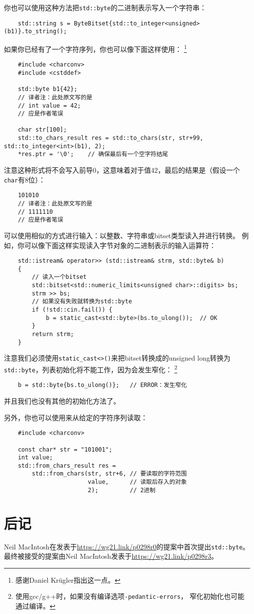 你也可以使用这种方法把\texttt{std::byte}的二进制表示写入一个字符串：
\begin{lstlisting}
    std::string s = ByteBitset{std::to_integer<unsigned>(b1)}.to_string();
\end{lstlisting}
如果你已经有了一个字符序列，你也可以像下面这样使用：
\footnote{感谢Daniel Krügler指出这一点。}
\begin{lstlisting}
    #include <charconv>
    #include <cstddef>

    std::byte b1{42};
    // 译者注：此处原文写的是
    // int value = 42;
    // 应是作者笔误

    char str[100];
    std::to_chars_result res = std::to_chars(str, str+99, std::to_integer<int>(b1), 2);
    *res.ptr = '\0';    // 确保最后有一个空字符结尾
\end{lstlisting}
注意这种形式将不会写入前导0，这意味着对于值42，最后的结果是（假设一个\texttt{char}有8位）：
\begin{lstlisting}
    101010
    // 译者注：此处原文写的是
    // 1111110
    // 应是作者笔误
\end{lstlisting}
可以使用相似的方式进行输入：以整数、字符串或bitset类型读入并进行转换。
例如，你可以像下面这样实现读入字节对象的二进制表示的输入运算符：
\begin{lstlisting}
    std::istream& operator>> (std::istream& strm, std::byte& b)
    {
        // 读入一个bitset
        std::bitset<std::numeric_limits<unsigned char>::digits> bs;
        strm >> bs;
        // 如果没有失败就转换为std::byte
        if (!std::cin.fail()) {
            b = static_cast<std::byte>(bs.to_ulong());  // OK
        }
        return strm;
    }
\end{lstlisting}
注意我们必须使用\texttt{static\_cast<>()}来把bitset转换成的unsigned long转换为
\texttt{std::byte}，列表初始化将不能工作，因为会发生窄化：
\footnote{使用gcc/g++时，如果没有编译选项\texttt{-pedantic-errors}，
窄化初始化也可能通过编译。}
\begin{lstlisting}
    b = std::byte{bs.to_ulong()};   // ERROR：发生窄化
\end{lstlisting}
并且我们也没有其他的初始化方法了。

另外，你也可以使用来从给定的字符序列读取：
\begin{lstlisting}
    #include <charconv>

    const char* str = "101001";
    int value;
    std::from_chars_result res =
        std::from_chars(str, str+6, // 要读取的字符范围
                        value,      // 读取后存入的对象
                        2);         // 2进制
\end{lstlisting}


\section{后记}
Neil MacIntosh在发表于\url{https://wg21.link/p0298r0}的提案中首次提出\texttt{std::byte}。
最终被接受的提案由Neil MacIntosh发表于\url{https://wg21.link/p0298r3}。
